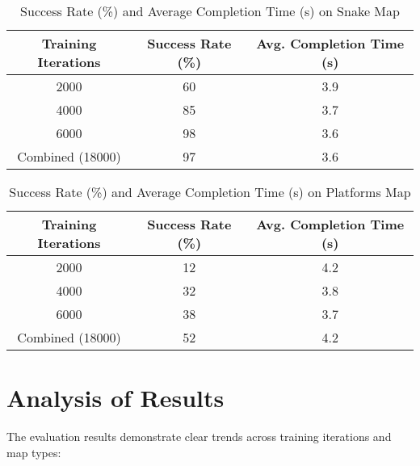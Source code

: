 \begin{table}[H]
\centering
\caption{Success Rate (\%) and Average Completion Time (s) on Snake Map}
\begin{tabular}{|c|c|c|}
\hline
\textbf{Training Iterations} & \textbf{Success Rate (\%)} & \textbf{Avg. Completion Time (s)} \\
\hline
2000 & 60 & 3.9 \\
\hline
4000 & 85 & 3.7 \\
\hline
6000 & 98 & 3.6 \\
\hline
Combined (18000) & 97 & 3.6 \\
\hline
\end{tabular}
\end{table}

\begin{table}[H]
\centering
\caption{Success Rate (\%) and Average Completion Time (s) on Platforms Map}
\begin{tabular}{|c|c|c|}
\hline
\textbf{Training Iterations} & \textbf{Success Rate (\%)} & \textbf{Avg. Completion Time (s)} \\
\hline
2000 & 12 & 4.2 \\
\hline
4000 & 32 & 3.8 \\
\hline
6000 & 38 & 3.7 \\
\hline
Combined (18000) & 52 & 4.2 \\
\hline
\end{tabular}
\end{table}

\section{Analysis of Results}

The evaluation results demonstrate clear trends across training iterations and map types:


